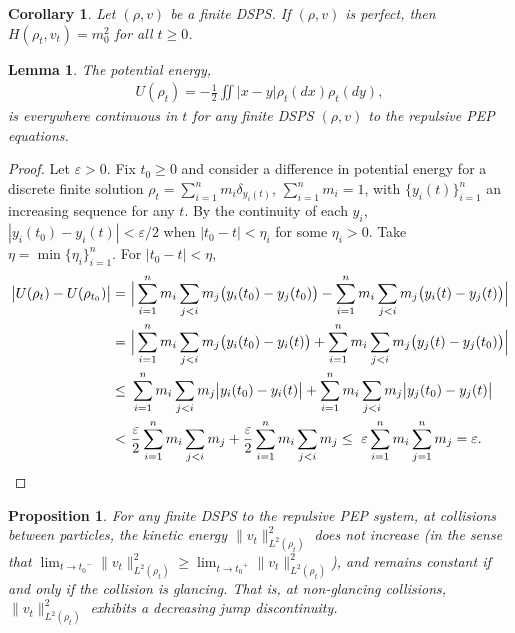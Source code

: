 \documentclass[11pt]{article}
\newtheorem{lemma}[theorem]{Lemma}
\newtheorem{corollary}[theorem]{Corollary}
\newtheorem{proposition}[theorem]{Proposition}
\numberwithin{equation}{section}
\begin{document}
        \begin{corollary}\label{energy-perfect}
            Let $(\rho,v)$ be a finite DSPS. If $(\rho,v)$ is perfect, then $H(\rho_t,v_t)=m_0^2$ for all $t\geq0$. 
        \end{corollary}
        \begin{lemma}\label{PE-continuity}
            The potential energy, 
            \begin{align}
                U(\rho_t)=-\frac{1}{2}\iint|x-y|\rho_t(dx)\rho_t(dy), 
            \end{align}
            is everywhere continuous in $t$ for any finite DSPS $(\rho,v)$ to the repulsive PEP equations. 
        \end{lemma}
        \begin{proof}
            Let $\varepsilon>0$. Fix $t_0\geq0$ and consider a difference in potential energy for a discrete finite solution $\rho_t=\sum_{i=1}^n m_i\delta_{y_i(t)}$, $\sum_{i=1}^nm_i=1$, with $\{y_i(t)\}_{i=1}^n$ an increasing sequence for any $t$. By the continuity of each $y_i$, $|y_i(t_0)-y_i(t)|<\varepsilon/2$ when $|t_0-t|<\eta_i$ for some $\eta_i>0$. Take $\eta=\min\{\eta_i\}_{i=1}^n$. For $|t_0-t|<\eta$,
            \begin{align*}
                \big|U(\rho_t)-U(\rho_{t_0})\big|=\ &\Big|\sum_{i=1}^n m_i\sum_{j<i}m_j\big(y_i(t_0)-y_j(t_0)\big)-\sum_{i=1}^n m_i\sum_{j<i}m_j\big(y_i(t)-y_j(t)\big)\Big|
                \\
                =\ &\Big|\sum_{i=1}^n m_i\sum_{j<i}m_j\big(y_i(t_0)-y_i(t)\big)+\sum_{i=1}^n m_i\sum_{j<i}m_j\big(y_j(t)-y_j(t_0)\big)\Big|
                \\
                \leq\ &\sum_{i=1}^n m_i\sum_{j<i}m_j\big|y_i(t_0)-y_i(t)\big|+\sum_{i=1}^n m_i\sum_{j<i}m_j\big|y_j(t_0)-y_j(t)\big|
                \\
                <\ &\frac{\varepsilon}{2}\sum_{i=1}^nm_i\sum_{j<i}m_j+\frac{\varepsilon}{2}\sum_{i=1}^nm_i\sum_{j<i}m_j\leq\ \varepsilon\sum_{i=1}^nm_i\sum_{j=1}^nm_j=\varepsilon. \qedhere
            \end{align*}
        \end{proof}
        \begin{proposition}\label{KE-discontinuity}
            For any finite DSPS to the repulsive PEP system, at collisions between particles, the kinetic energy $\|v_t\|_{L^2(\rho_t)}^2$ does not increase (in the sense that $\lim_{t\to {t_0}^-}\|v_t\|^2_{L^2(\rho_t)}\geq\lim_{t\to {t_0}^+}\|v_t\|^2_{L^2(\rho_t)}$), and remains constant if and only if the collision is glancing. That is, at non-glancing collisions, $\|v_t\|_{L^2(\rho_t)}^2$ exhibits a decreasing jump discontinuity. 
        \end{proposition}
\end{document}
